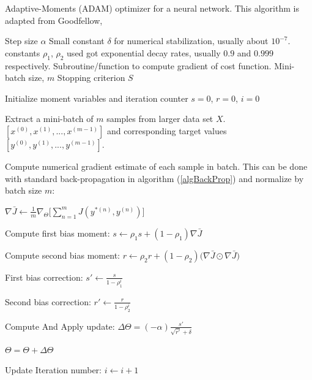 \documentclass[12pt,letterpaper]{article}
\begin{document}
\begin{algorithm}[H]
\caption{Adaptive-Moments (ADAM) optimizer for a neural network. This algorithm is adapted from Goodfellow, \cite{Goodfellow}}
\label{alg-ADAM}

\begin{algorithmic}
\REQUIRE Step size $\alpha$
\REQUIRE Small constant $\delta$ for numerical stabilization, usually about $10^{-7}$.
\REQUIRE constants $\rho_1$, $\rho_2$ used got exponential decay rates, usually $0.9$ and $0.999$ respectively.
\REQUIRE Subroutine/function to compute gradient of cost function.
\REQUIRE Mini-batch size, $m$
\REQUIRE Stopping criterion $S$

Initialize moment variables and iteration counter $s = 0$, $r = 0$, $i = 0$ \\

	\item Extract a mini-batch of $m$ samples from larger data set $X$. $[x^{(0)},x^{(1)},...,x^{(m-1)}]$ and corresponding target values 
	$[y^{(0)},y^{(1)},...,y^{(m-1)}]$.
	\item Compute numerical gradient estimate of each sample in batch. This can be done with standard back-propagation in algorithm (\ref{algBackProp}) and 			 	normalize by batch size $m$:
	\item $\nabla \bar{J} \leftarrow \frac{1}{m} \nabla_{\Theta} \Big[\sum_{n=1}^{m} J(y^{*(n)},y^{(n)}) \Big]$
	
	\item Compute first bias moment: $s \leftarrow \rho_1 s + (1 - \rho_1) \nabla \bar{J}$
	\item Compute second bias moment: $r \leftarrow \rho_2 r + (1 - \rho_2) \big( \nabla \bar{J} \odot \nabla \bar{J} \big)$
	\item First bias correction: $s' \leftarrow \frac{s}{1 - \rho_1^i}$
	\item Second bias correction: $r' \leftarrow \frac{r}{1 - \rho_2^i}$
	
	\item Compute And Apply update:	$\Delta \Theta = (-\alpha) \frac{s'}{\sqrt{r'} + \delta}$
	\item $\Theta = \Theta + \Delta \Theta$	
	\item Update Iteration number: $i \leftarrow i + 1$
\ENDWHILE

\end{algorithmic}
\end{algorithm}


\end{document}
